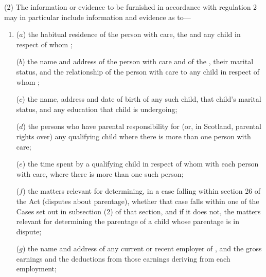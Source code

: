 \documentclass[a4paper,12pt]{article}
\begin{document}
(2) The information or evidence to be furnished in accordance with regulation 2 may in particular include information and evidence as to—
\begin{enumerate}\item[]
($a$) the habitual residence of the person with care, the  and any child in respect of whom 
; %

($b$) the name and address of the person with care and of the , their marital status, and the relationship of the person with care to any child in respect of whom 
; %

($c$) the name, address and date of birth of any such child, that child’s marital status, and any education that child is undergoing;

($d$) the persons who have parental responsibility for (or, in Scotland, parental rights over) any qualifying child where there is more than one person with care;

($e$) the time spent by a qualifying child in respect of whom 
with each person with care, where there is more than one such person;

($f$) the matters relevant for determining, in a case falling within section 26 of the Act (disputes about parentage), whether that case falls within one of the Cases set out in subsection (2) of that section, and if it does not, the matters relevant for determining the parentage of a child whose parentage is in dispute;

($g$) the name and address of any current or recent employer of %
,  %
and the gross earnings and the deductions from those earnings deriving from each employment;


\end{enumerate}
\end{document}
